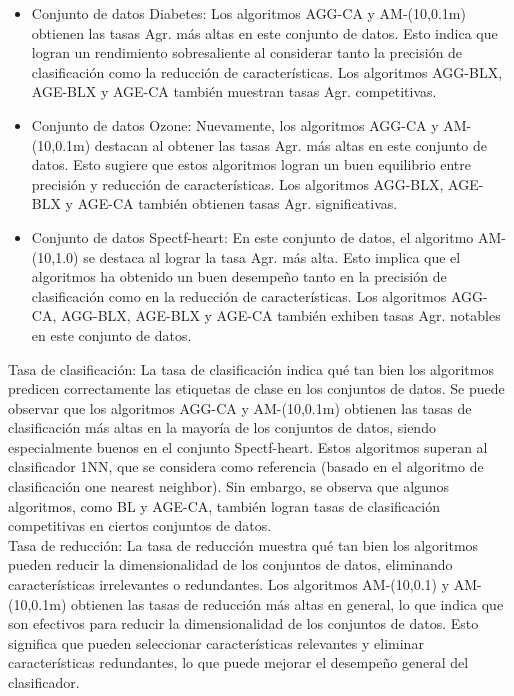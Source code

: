  \begin{itemize}
 	\item Conjunto de datos Diabetes: Los algoritmos AGG-CA y AM-(10,0.1m) obtienen las tasas Agr. más altas en este conjunto de datos. Esto indica que logran un rendimiento sobresaliente al considerar tanto la precisión de clasificación como la reducción de características. Los algoritmos AGG-BLX, AGE-BLX y AGE-CA también muestran tasas Agr. competitivas.
 	
 	\item Conjunto de datos Ozone: Nuevamente, los algoritmos AGG-CA y AM-(10,0.1m) destacan al obtener las tasas Agr. más altas en este conjunto de datos. Esto sugiere que estos algoritmos logran un buen equilibrio entre precisión y reducción de características. Los algoritmos AGG-BLX, AGE-BLX y AGE-CA también obtienen tasas Agr. significativas.
 	
 	\item Conjunto de datos Spectf-heart: En este conjunto de datos, el algoritmo AM-(10,1.0) se destaca al lograr la tasa Agr. más alta. Esto implica que el algoritmos ha obtenido un buen desempeño tanto en la precisión de clasificación como en la reducción de características. Los algoritmos AGG-CA, AGG-BLX, AGE-BLX y AGE-CA también exhiben tasas Agr. notables en este conjunto de datos.
 \end{itemize}

Tasa de clasificación: La tasa de clasificación indica qué tan bien los algoritmos predicen correctamente las etiquetas de clase en los conjuntos de datos. Se puede observar que los algoritmos AGG-CA y AM-(10,0.1m) obtienen las tasas de clasificación más altas en la mayoría de los conjuntos de datos, siendo especialmente buenos en el conjunto Spectf-heart. Estos algoritmos superan al clasificador 1NN, que se considera como referencia (basado en el algoritmo de clasificación one nearest neighbor). Sin embargo, se observa que algunos algoritmos, como BL y AGE-CA, también logran tasas de clasificación competitivas en ciertos conjuntos de datos.\\

Tasa de reducción: La tasa de reducción muestra qué tan bien los algoritmos pueden reducir la dimensionalidad de los conjuntos de datos, eliminando características irrelevantes o redundantes. Los algoritmos AM-(10,0.1) y AM-(10,0.1m) obtienen las tasas de reducción más altas en general, lo que indica que son efectivos para reducir la dimensionalidad de los conjuntos de datos. Esto significa que pueden seleccionar características relevantes y eliminar características redundantes, lo que puede mejorar el desempeño general del clasificador.\\

